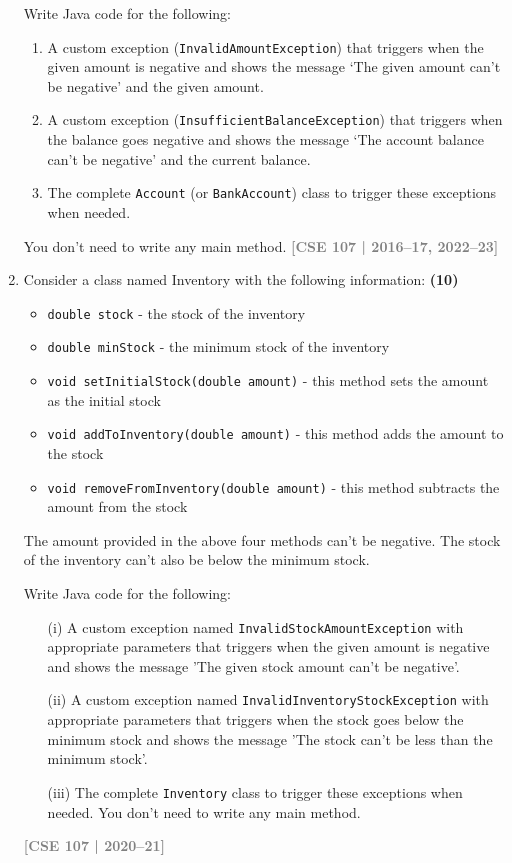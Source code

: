 \documentclass[12pt,a3paper]{article}
\newcommand{\yr}[1]{\hfill\textcolor{gray}{\small\textbf{[#1]}}}
\begin{document}
\begin{enumerate}
Write Java code for the following:
\begin{enumerate}
    \item A custom exception (\texttt{InvalidAmountException}) that triggers when the given amount is negative and shows the message `The given amount can't be negative' and the given amount.
    \item A custom exception (\texttt{InsufficientBalanceException}) that triggers when the balance goes negative and shows the message `The account balance can't be negative' and the current balance.
    \item The complete \texttt{Account} (or \texttt{BankAccount}) class to trigger these exceptions when needed.
\end{enumerate}
You don't need to write any main method.
\yr{CSE 107 | 2016--17, 2022--23}




\item Consider a class named Inventory with the following information: \hfill \textbf{(10)}
\begin{itemize}
    \item \texttt{double stock} - the stock of the inventory
    \item \texttt{double minStock} - the minimum stock of the inventory
    \item \texttt{void setInitialStock(double amount)} - this method sets the amount as the initial stock
    \item \texttt{void addToInventory(double amount)} - this method adds the amount to the stock
    \item \texttt{void removeFromInventory(double amount)} - this method subtracts the amount from the stock
\end{itemize}
The amount provided in the above four methods can't be negative. The stock of the inventory can't also be below the minimum stock.

Write Java code for the following:
\begin{itemize}
    \item[(i)] A custom exception named \texttt{InvalidStockAmountException} with appropriate parameters that triggers when the given amount is negative and shows the message 'The given stock amount can't be negative'.
    \item[(ii)] A custom exception named \texttt{InvalidInventoryStockException} with appropriate parameters that triggers when the stock goes below the minimum stock and shows the message 'The stock can't be less than the minimum stock'.
    \item[(iii)] The complete \texttt{Inventory} class to trigger these exceptions when needed. You don't need to write any main method.
\end{itemize}
\yr{CSE 107 | 2020--21}


\end{enumerate}
\end{document}
